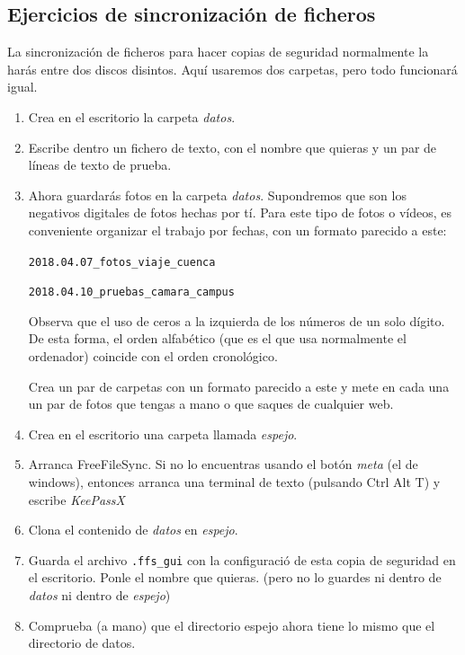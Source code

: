 \documentclass[a4paper,12pt]{article}
\begin{document}
\subsection{Ejercicios de sincronización de ficheros}

La sincronización de ficheros para hacer copias de seguridad normalmente la harás entre
dos discos disintos. Aquí usaremos dos carpetas, pero todo funcionará igual.

\begin{enumerate}
\item
Crea en el escritorio la carpeta \emph{datos}.

\item
Escribe dentro un fichero de texto, con el nombre que quieras y un par de líneas de texto de prueba.

\item
Ahora guardarás fotos en la carpeta
\emph{datos}. 
Supondremos que son los negativos digitales de fotos hechas
por tí. Para este tipo de fotos o vídeos, es conveniente organizar el trabajo por fechas, con un formato
parecido a este:

\verb|2018.04.07_fotos_viaje_cuenca|


\verb|2018.04.10_pruebas_camara_campus|


Observa que el uso de ceros a la izquierda de los números de un solo dígito. De esta forma, el orden
alfabético (que es el que usa normalmente el ordenador) coincide con el orden cronológico.

Crea un par de carpetas con un formato parecido a este y mete en cada una un par de fotos
que tengas a mano o que saques de cualquier web.


\item
Crea en el escritorio una carpeta llamada \emph{espejo}.


\item
Arranca FreeFileSync. Si no lo encuentras usando el botón \emph{meta} (el de windows), entonces arranca
una terminal de texto (pulsando Ctrl Alt T) y escribe \emph{KeePassX}

\item
Clona el contenido de \emph{datos} en \emph{espejo}.

\item
Guarda el archivo \verb|.ffs_gui| con la configuració de esta copia de seguridad en el escritorio. Ponle
el nombre que quieras. (pero no lo guardes ni dentro de 
\emph{datos} ni dentro de  \emph{espejo})


\item
Comprueba (a mano) que el directorio espejo ahora tiene lo mismo que el directorio de datos.



\end{enumerate}
\end{document}
